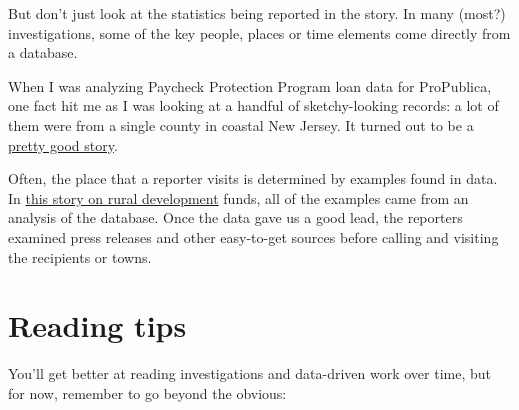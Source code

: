 \documentclass[
  letterpaper,
  DIV=11,
  numbers=noendperiod]{scrreprt}
\begin{document}
But don't just look at the statistics being reported in the story. In
many (most?) investigations, some of the key people, places or time
elements come directly from a database.

When I was analyzing Paycheck Protection Program loan data for
ProPublica, one fact hit me as I was looking at a handful of
sketchy-looking records: a lot of them were from a single county in
coastal New Jersey. It turned out to be a
\href{https://www.propublica.org/article/ppp-farms}{pretty good story}.

Often, the place that a reporter visits is determined by examples found
in data. In \href{pdfs/rural_development.pdf}{this story on rural
development} funds, all of the examples came from an analysis of the
database. Once the data gave us a good lead, the reporters examined
press releases and other easy-to-get sources before calling and visiting
the recipients or towns.

\hypertarget{reading-tips}{%
\section{Reading tips}\label{reading-tips}}

You'll get better at reading investigations and data-driven work over
time, but for now, remember to go beyond the obvious:
\end{document}
